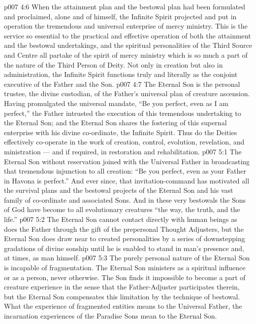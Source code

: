 \vs p007 4:6 \bibnobreakspace {} When the attainment plan and the bestowal plan had been formulated and proclaimed, alone and of himself, the Infinite Spirit projected and put in operation the tremendous and universal enterprise of mercy ministry. This is the service so essential to the practical and effective operation of both the attainment and the bestowal undertakings, and the spiritual personalities of the Third Source and Centre all partake of the spirit of mercy ministry which is so much a part of the nature of the Third Person of Deity. Not only in creation but also in administration, the Infinite Spirit functions truly and literally as the conjoint executive of the Father and the Son.
\vs p007 4:7 \pc The Eternal Son is the personal trustee, the divine custodian, of the Father’s universal plan of creature ascension. Having promulgated the universal mandate, “Be you perfect, even as I am perfect,” the Father intrusted the execution of this tremendous undertaking to the Eternal Son; and the Eternal Son shares the fostering of this supernal enterprise with his divine co\hyp{}ordinate, the Infinite Spirit. Thus do the Deities effectively co\hyp{}operate in the work of creation, control, evolution, revelation, and ministration --- and if required, in restoration and rehabilitation.
\vs p007 5:1 The Eternal Son without reservation joined with the Universal Father in broadcasting that tremendous injunction to all creation: “Be you perfect, even as your Father in Havona is perfect.” And ever since, that invitation\hyp{}command has motivated all the survival plans and the bestowal projects of the Eternal Son and his vast family of co\hyp{}ordinate and associated Sons. And in these very bestowals the Sons of God have become to all evolutionary creatures “the way, the truth, and the life.”
\vs p007 5:2 \pc The Eternal Son cannot contact directly with human beings as does the Father through the gift of the prepersonal Thought Adjusters, but the Eternal Son does draw near to created personalities by a series of downstepping gradations of divine sonship until he is enabled to stand in man’s presence and, at times, as man himself.
\vs p007 5:3 The purely personal nature of the Eternal Son is incapable of fragmentation. The Eternal Son ministers as a spiritual influence or as a person, never otherwise. The Son finds it impossible to become a part of creature experience in the sense that the Father\hyp{}Adjuster participates therein, but the Eternal Son compensates this limitation by the technique of bestowal. What the experience of fragmented entities means to the Universal Father, the incarnation experiences of the Paradise Sons mean to the Eternal Son.
